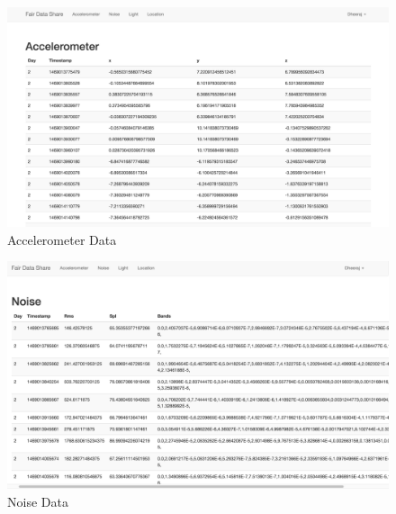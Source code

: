 
\begin{figure}[ht!]
\centering
\includegraphics[width=\textwidth,keepaspectratio]{./images/fds_user_acc_full}
\caption{Accelerometer Data\label{fig:fdsacc}}
\end{figure}

\begin{figure}[ht!]
\centering
\includegraphics[width=\textwidth,keepaspectratio]{./images/fds_user_noise_full}
\caption{Noise Data \label{fig:fdsnoise}}
\end{figure}




